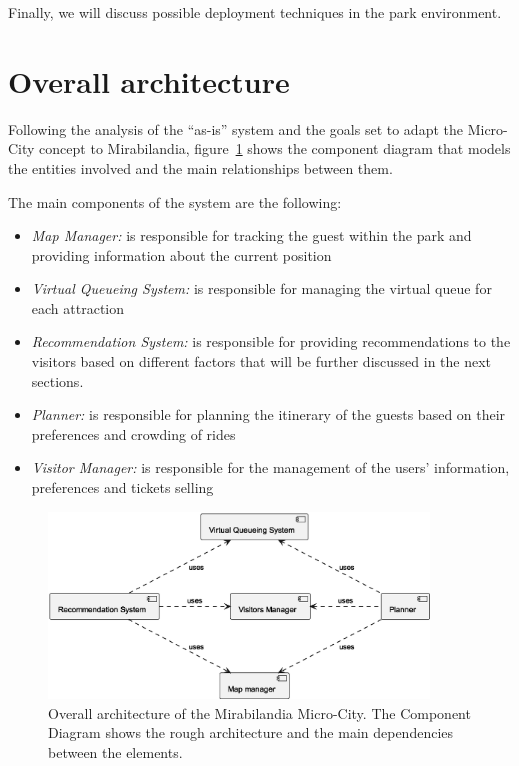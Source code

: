 Finally, we will discuss possible deployment techniques in the park environment. 

\section{Overall architecture}\label{sec:mira-microcity}
Following the analysis of the ``as-is'' system and the goals set to adapt the Micro-City concept to Mirabilandia,
figure~\ref{fig:architecture-overview} shows the component diagram that models the entities involved and the main relationships between them.

The main components of the system are the following:

\begin{itemize}
	\item \textit{Map Manager:} is responsible for tracking the guest within the park and providing information about the current position
	\item \textit{Virtual Queueing System:} is responsible for managing the virtual queue for each attraction
	\item \textit{Recommendation System:} is responsible for providing recommendations to the visitors based on different factors that will be further discussed in the next sections.
	\item \textit{Planner:} is responsible for planning the itinerary of the guests based on their preferences and crowding of rides
	\item \textit{Visitor Manager:} is responsible for the management of the users' information, preferences and tickets selling
\end{itemize}

\begin{figure}[H]
	\centering
	\includegraphics[width=0.9\textwidth]{img/architecture-overview.eps}
	\caption{Overall architecture of the Mirabilandia Micro-City.
		The Component Diagram shows the rough architecture and the main dependencies between the elements.
	}
	\label{fig:architecture-overview}
\end{figure}

